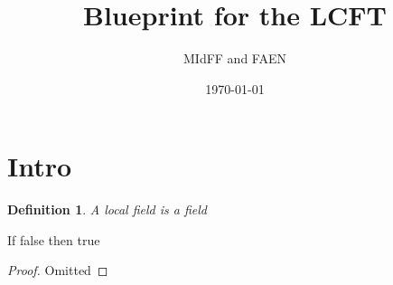 \documentclass[11pt]{amsart}
\date{\today}
\title{Blueprint for the LCFT}
\author{MIdFF and FAEN}
\newtheorem{definition}{Definition}
\begin{document}
\section{Intro}
\begin{definition}
\label{def_local_field}
A local field is a field
\end{definition}

\begin{lemma}
\label{A_cool_one}
If false then true
\end{lemma}
\begin{proof}Omitted
\end{proof}

%
%
%
\end{document}

